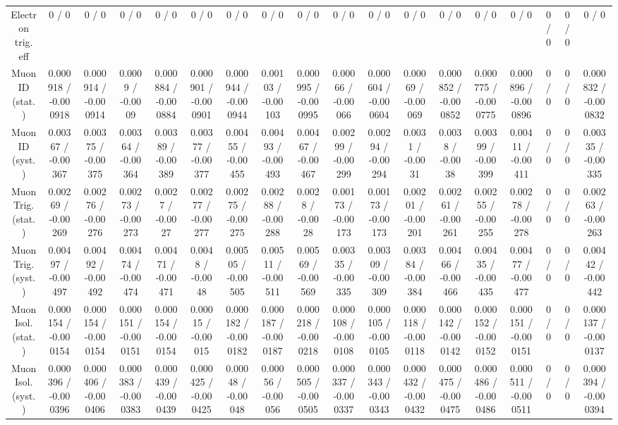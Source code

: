 \documentclass[10pt]{article}
\begin{document}
\begin{table}[htbp]
\begin{center}
\begin{tabular}{|c|c|c|c|c|c|c|c|c|c|c|c|c|c|c|c|c|c|}
  Electron trig. eff & 0 / 0 & 0 / 0 & 0 / 0 & 0 / 0 & 0 / 0 & 0 / 0 & 0 / 0 & 0 / 0 & 0 / 0 & 0 / 0 & 0 / 0 & 0 / 0 & 0 / 0 & 0 / 0 & 0 / 0 & 0 / 0 & 0 / 0 \\ 
  Muon ID (stat.) & 0.000918 / -0.000918 & 0.000914 / -0.000914 & 0.0009 / -0.0009 & 0.000884 / -0.000884 & 0.000901 / -0.000901 & 0.000944 / -0.000944 & 0.00103 / -0.00103 & 0.000995 / -0.000995 & 0.00066 / -0.00066 & 0.000604 / -0.000604 & 0.00069 / -0.00069 & 0.000852 / -0.000852 & 0.000775 / -0.000775 & 0.000896 / -0.000896 & 0 / 0 & 0 / 0 & 0.000832 / -0.000832 \\ 
  Muon ID (syst.) & 0.00367 / -0.00367 & 0.00375 / -0.00375 & 0.00364 / -0.00364 & 0.00389 / -0.00389 & 0.00377 / -0.00377 & 0.00455 / -0.00455 & 0.00493 / -0.00493 & 0.00467 / -0.00467 & 0.00299 / -0.00299 & 0.00294 / -0.00294 & 0.0031 / -0.0031 & 0.0038 / -0.0038 & 0.00399 / -0.00399 & 0.00411 / -0.00411 & 0 / 0 & 0 / 0 & 0.00335 / -0.00335 \\ 
  Muon Trig. (stat.) & 0.00269 / -0.00269 & 0.00276 / -0.00276 & 0.00273 / -0.00273 & 0.0027 / -0.0027 & 0.00277 / -0.00277 & 0.00275 / -0.00275 & 0.00288 / -0.00288 & 0.0028 / -0.0028 & 0.00173 / -0.00173 & 0.00173 / -0.00173 & 0.00201 / -0.00201 & 0.00261 / -0.00261 & 0.00255 / -0.00255 & 0.00278 / -0.00278 & 0 / 0 & 0 / 0 & 0.00263 / -0.00263 \\ 
  Muon Trig. (syst.) & 0.00497 / -0.00497 & 0.00492 / -0.00492 & 0.00474 / -0.00474 & 0.00471 / -0.00471 & 0.0048 / -0.0048 & 0.00505 / -0.00505 & 0.00511 / -0.00511 & 0.00569 / -0.00569 & 0.00335 / -0.00335 & 0.00309 / -0.00309 & 0.00384 / -0.00384 & 0.00466 / -0.00466 & 0.00435 / -0.00435 & 0.00477 / -0.00477 & 0 / 0 & 0 / 0 & 0.00442 / -0.00442 \\ 
  Muon Isol. (stat.) & 0.000154 / -0.000154 & 0.000154 / -0.000154 & 0.000151 / -0.000151 & 0.000154 / -0.000154 & 0.00015 / -0.00015 & 0.000182 / -0.000182 & 0.000187 / -0.000187 & 0.000218 / -0.000218 & 0.000108 / -0.000108 & 0.000105 / -0.000105 & 0.000118 / -0.000118 & 0.000142 / -0.000142 & 0.000152 / -0.000152 & 0.000151 / -0.000151 & 0 / 0 & 0 / 0 & 0.000137 / -0.000137 \\ 
  Muon Isol. (syst.) & 0.000396 / -0.000396 & 0.000406 / -0.000406 & 0.000383 / -0.000383 & 0.000439 / -0.000439 & 0.000425 / -0.000425 & 0.00048 / -0.00048 & 0.00056 / -0.00056 & 0.000505 / -0.000505 & 0.000337 / -0.000337 & 0.000343 / -0.000343 & 0.000432 / -0.000432 & 0.000475 / -0.000475 & 0.000486 / -0.000486 & 0.000511 / -0.000511 & 0 / 0 & 0 / 0 & 0.000394 / -0.000394 \\ 

\end{tabular}
\end{center}
\end{table}
\end{document}
